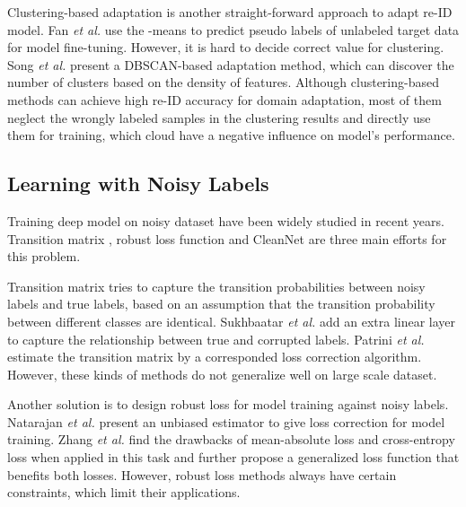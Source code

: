 \documentclass[letterpaper]{article} \usepackage{aaai20}  \usepackage{times}  \usepackage{helvet} \usepackage{courier}  \usepackage[hyphens]{url}  \usepackage{graphicx} \urlstyle{rm} \def\UrlFont{\rm}  \usepackage{graphicx}  \frenchspacing  \setlength{\pdfpagewidth}{8.5in}  \setlength{\pdfpageheight}{11in}  \usepackage{color}
\begin{document}
Clustering-based adaptation is another straight-forward approach to adapt re-ID model. Fan \textit{et al.} \cite{fan2017unsupervised} use the -means \cite{lloyd1982least} to predict pseudo labels of unlabeled target data for model fine-tuning. However, it is hard to decide correct  value for clustering. Song \textit{et al.} \cite{song2018unsupervised} present a DBSCAN-based adaptation method, which can discover the number of clusters based on the density of features. Although clustering-based methods can achieve high re-ID accuracy for domain adaptation, most of them neglect the wrongly labeled samples in the clustering results and directly use them for training, which cloud have a negative influence on model's performance.

\subsection{Learning with Noisy Labels}

Training deep model on noisy dataset have been widely studied in recent years. Transition matrix \cite{sukhbaatar2014training,patrini2017making}, robust loss function \cite{natarajan2013learning,zhang2018generalized} and CleanNet \cite{lee2018cleannet} are three main efforts for this problem. 

Transition matrix tries to capture the transition probabilities between noisy labels and true labels, based on an assumption that the transition probability between different classes are identical. Sukhbaatar \textit{et al.} \cite{sukhbaatar2014training} add an extra linear layer to capture the relationship between true and corrupted labels. Patrini \textit{et al.} \cite{patrini2017making} estimate the transition matrix by a corresponded loss correction algorithm. However, these kinds of methods do not generalize well on large scale dataset.

Another solution is to design robust loss for model training against noisy labels. Natarajan \textit{et al.} \cite{natarajan2013learning} present an unbiased estimator to give loss correction for model training. Zhang \emph{et al.} \cite{zhang2018generalized} find the drawbacks of mean-absolute loss and cross-entropy loss when applied in this task and further propose a generalized loss function that benefits both losses. However, robust loss methods always have certain constraints, which limit their applications.
\end{document}
